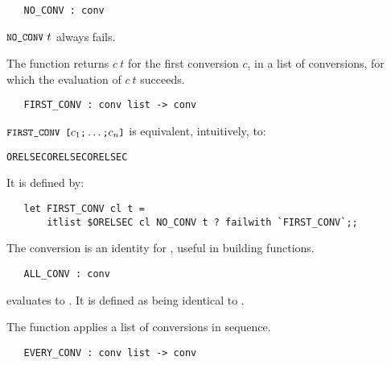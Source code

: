 \begin{boxed}
\begin{verbatim}
   NO_CONV : conv
\end{verbatim}\end{boxed}

\noindent $\ml{NO\_CONV}\ t$ always fails.

The function 
returns $c\ t$ for the first conversion $c$, in a list of conversions,
for which the evaluation of $c\ t$ succeeds.

\begin{boxed}
\begin{verbatim}
   FIRST_CONV : conv list -> conv
\end{verbatim}\end{boxed}

\noindent $\ml{FIRST\_CONV [}c_1\ml{;}\ldots\ml{;}c_n\ml{]}$ is equivalent,
intuitively, to:

\begin{hol}
\begin{alltt}
    ORELSEC  ORELSEC \m{\ldots} ORELSEC 
\end{alltt}\end{hol}

\noindent It is defined by:

\begin{hol}\begin{verbatim}
   let FIRST_CONV cl t = 
       itlist $ORELSEC cl NO_CONV t ? failwith `FIRST_CONV`;;
\end{verbatim}\end{hol}

The conversion  is an identity for , useful
in building functions.

\begin{boxed}
\begin{verbatim}
   ALL_CONV : conv
\end{verbatim}\end{boxed}

\noindent {} evaluates to . It is 
defined as being identical to .

The function  applies a list of conversions in sequence.

\begin{boxed}
\begin{verbatim}
   EVERY_CONV : conv list -> conv
\end{verbatim}\end{boxed}

